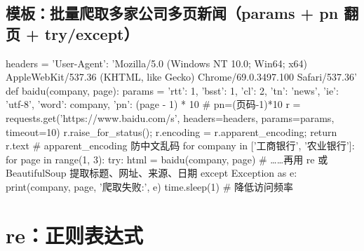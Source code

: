 \subsection{模板：批量爬取多家公司多页新闻（params + pn 翻页 + try/except）}
\begin{PYQcode}
headers = {'User-Agent': 'Mozilla/5.0 (Windows NT 10.0; Win64; x64) AppleWebKit/537.36 (KHTML, like Gecko) Chrome/69.0.3497.100 Safari/537.36'}
def baidu(company, page):
    params = {'rtt': 1, 'bsst': 1, 'cl': 2, 'tn': 'news', 'ie': 'utf-8', 'word': company, 'pn': (page - 1) * 10}  # pn=(页码-1)*10
    r = requests.get('https://www.baidu.com/s', headers=headers, params=params, timeout=10)
    r.raise_for_status(); r.encoding = r.apparent_encoding; return r.text   # apparent_encoding 防中文乱码
for company in ['工商银行', '农业银行']:
    for page in range(1, 3):
        try:
            html = baidu(company, page)            # ……再用 re 或 BeautifulSoup 提取标题、网址、来源、日期
        except Exception as e:
            print(company, page, '爬取失败:', e)
        time.sleep(1)                              # 降低访问频率
\end{PYQcode}

\section{re：正则表达式}

